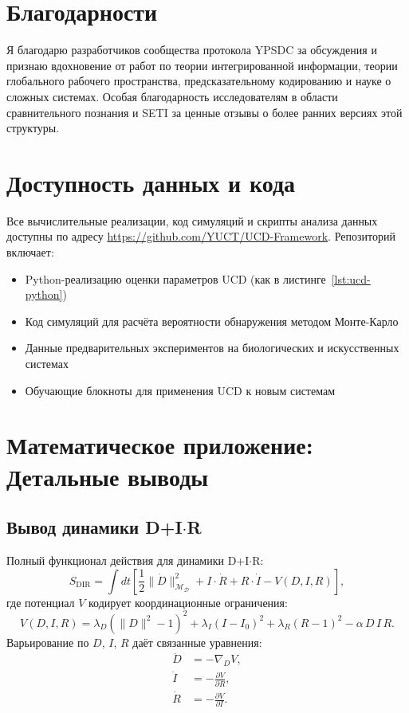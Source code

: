\documentclass[12pt,a4paper]{article}
\newcommand{\Dict}{\mathcal{D}}
\newcommand{\Mdict}{\mathcal{M}_{\Dict}}
\begin{document}
	\section*{Благодарности}
	
	Я благодарю разработчиков сообщества протокола YPSDC за обсуждения и признаю вдохновение от работ по теории интегрированной информации, теории глобального рабочего пространства, предсказательному кодированию и науке о сложных системах. Особая благодарность исследователям в области сравнительного познания и SETI за ценные отзывы о более ранних версиях этой структуры.
	
	\section*{Доступность данных и кода}
	
	Все вычислительные реализации, код симуляций и скрипты анализа данных доступны по адресу \url{https://github.com/YUCT/UCD-Framework}. Репозиторий включает:
	\begin{itemize}
		\item Python-реализацию оценки параметров UCD (как в листинге~\ref{lst:ucd-python})
		\item Код симуляций для расчёта вероятности обнаружения методом Монте-Карло
		\item Данные предварительных экспериментов на биологических и искусственных системах
		\item Обучающие блокноты для применения UCD к новым системам
	\end{itemize}
	
	\appendix
	
	\section{Математическое приложение: Детальные выводы}
	
	\subsection{Вывод динамики D+I\(\cdot\)R}
	
	Полный функционал действия для динамики D+I\(\cdot\)R:
	\[
	S_{\mathrm{DIR}} = \int dt \left[ \frac{1}{2}\|\dot{D}\|^2_{\Mdict} + I \cdot \dot{R} + R \cdot \dot{I} - V(D,I,R) \right],
	\]
	где потенциал \(V\) кодирует координационные ограничения:
	\[
	V(D,I,R) = \lambda_D (\|D\|^2 - 1)^2 + \lambda_I (I - I_0)^2 + \lambda_R (R - 1)^2 - \alpha\, D\,I\,R.
	\]
	Варьирование по \(D\), \(I\), \(R\) даёт связанные уравнения:
	\begin{align*}
		\ddot{D} &= -\nabla_D V, \\
		\dot{I}  &= -\frac{\partial V}{\partial R}, \\
		\dot{R}  &= -\frac{\partial V}{\partial I}.
	\end{align*}
	
\end{document}
